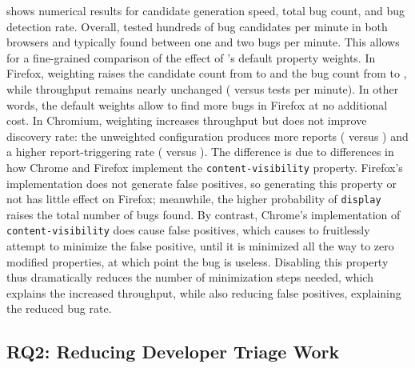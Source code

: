  shows numerical results
  for candidate generation speed,
  total bug count, and bug detection rate.
Overall, \toolname tested
  hundreds of bug candidates per minute in both browsers
  and typically found between one and two bugs per minute.
This allows for a fine-grained comparison of
  the effect of \toolname's default property weights.
In Firefox, weighting raises the candidate count
  from \FirefoxNoWeightsBugs{} to \FirefoxWeightsBugs{}
  and the bug count from \FirefoxNoWeightsRate{} to \FirefoxWeightsRate{},
  while throughput remains nearly unchanged
  (\FirefoxNoWeightsSpeed{} versus \FirefoxWeightsSpeed{} tests per minute).
In other words, the default weights allow \toolname
  to find more bugs in Firefox at no additional cost.
In Chromium,
  weighting increases throughput
  but does not improve discovery rate:
  the unweighted configuration produces more reports
  (\ChromiumNoWeightsBugs{} versus \ChromiumWeightsBugs{})
  and a higher report-triggering rate
  (\ChromiumNoWeightsRate{} versus \ChromiumWeightsRate). 
The difference is due to differences in how Chrome and Firefox
  implement the \texttt{content-visibility} property.
Firefox's implementation does not generate false positives,
  so generating this property or not has little effect on Firefox;
  meanwhile, the higher probability of \texttt{display}
  raises the total number of bugs found.
By contrast, Chrome's implementation of \texttt{content-visibility}
  does cause false positives, which causes \toolname
  to fruitlessly attempt to minimize the false positive,
  until it is minimized all the way to zero modified properties,
  at which point the bug is useless.
Disabling this property thus dramatically reduces
  the number of minimization steps needed,
  which explains the increased throughput,
  while also reducing false positives,
  explaining the reduced bug rate.

\subsection{RQ2: Reducing Developer Triage Work}


